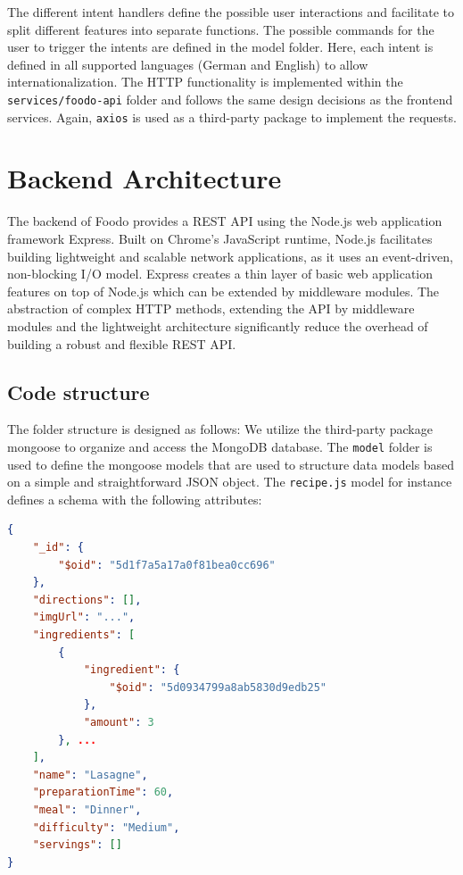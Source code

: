 The different intent handlers define the possible user interactions and facilitate to split different features into separate functions. The possible commands for the user to trigger the intents are defined in the model folder. Here, each intent is defined in all supported languages (German and English) to allow internationalization. The HTTP functionality is implemented within the \texttt{services/foodo-api} folder and follows the same design decisions as the frontend services. Again, \texttt{axios} is used as a third-party package to implement the requests. 

\section{Backend Architecture}

The backend of Foodo provides a REST API using the Node.js web application framework Express. Built on Chrome's JavaScript runtime, Node.js facilitates building lightweight and scalable network applications, as it uses an event-driven, non-blocking I/O model. Express creates a thin layer of basic web application features on top of Node.js which can be extended by middleware modules. The abstraction of complex HTTP methods, extending the API by middleware modules and the lightweight architecture significantly reduce the overhead of building a robust and flexible REST API.

\vspace{-1em}
\subsection*{Code structure}
The folder structure is designed as follows:
\vspace{1em}
We utilize the third-party package mongoose to organize and access the MongoDB database. The \texttt{model} folder is used to define the mongoose models that are used to structure data models based on a simple and straightforward JSON object. The \texttt{recipe.js} model for instance defines a schema with the following attributes:

\begin{scriptsize}
\begin{lstlisting}[language=json,firstnumber=1,caption={Example of recipe "Lasagne"},captionpos=b]
{
	"_id": {
		"$oid": "5d1f7a5a17a0f81bea0cc696"
	},
	"directions": [],
	"imgUrl": "...",
	"ingredients": [
		{
			"ingredient": {
				"$oid": "5d0934799a8ab5830d9edb25"
			},
			"amount": 3
		}, ...
	],
	"name": "Lasagne",
	"preparationTime": 60,
	"meal": "Dinner",
	"difficulty": "Medium",
	"servings": []
}
\end{lstlisting}
\end{scriptsize}

